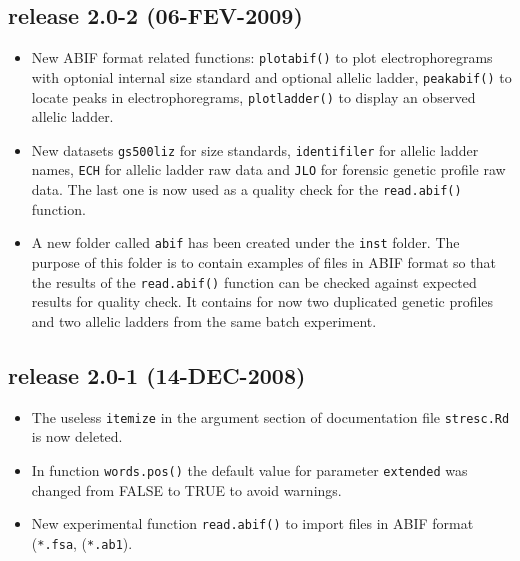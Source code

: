 \documentclass{article}
\begin{document}
\subsection*{release 2.0-2 (06-FEV-2009)}

\begin{itemize}

\item New ABIF format related functions: \texttt{plotabif()} to plot
electrophoregrams with optonial internal size standard and optional
allelic ladder, \texttt{peakabif()} to locate peaks in electrophoregrams,
\texttt{plotladder()} to display an observed allelic ladder.

\item New datasets \texttt{gs500liz} for size standards, \texttt{identifiler}
for allelic ladder names, \texttt{ECH} for allelic ladder raw data and
\texttt{JLO} for forensic genetic profile raw data. The last one is
now used as a quality check for the \texttt{read.abif()} function.

\item A new folder called \texttt{abif} has been created under the
\texttt{inst} folder. The purpose of this folder is to contain examples
of files in ABIF format so that the results of the \texttt{read.abif()}
function can be checked against expected results for quality check.
It contains for now two duplicated genetic profiles and two allelic
ladders from the same batch experiment.

\end{itemize}

\subsection*{release 2.0-1 (14-DEC-2008)}

\begin{itemize}

\item The useless \texttt{itemize} in the argument section of
  documentation file \texttt{stresc.Rd} is now deleted.

\item In function \texttt{words.pos()} the default value for parameter
  \texttt{extended} was changed from FALSE to TRUE to avoid warnings.

\item New experimental function \texttt{read.abif()} to import files
  in ABIF format (\texttt{*.fsa}, (\texttt{*.ab1}).

\end{itemize}
\end{document}
